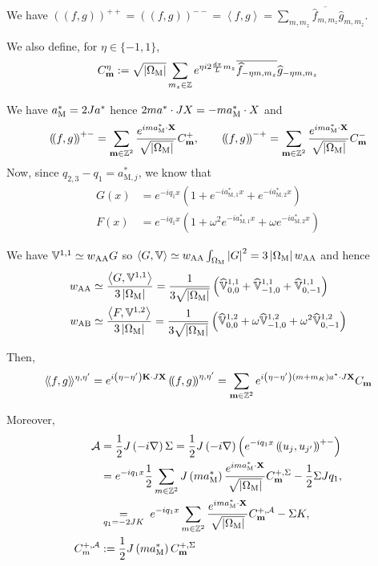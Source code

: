 \documentclass[11pt,a4paper,reqno,french,tikz]{amsart}
\newcommand\cA{\mathcal{A}}\newcommand\cB{\mathcal{B}}\newcommand\cC{\mathcal{C}}\newcommand\cD{\mathcal{D}}\newcommand\cE{\mathcal{E}}\newcommand\cF{\mathcal{F}}\newcommand\cG{\mathcal{G}}\newcommand\cH{\mathcal{H}}\newcommand\cI{\mathcal{I}}\newcommand\cJ{\mathcal{J}}\newcommand\cK{\mathcal{K}}\newcommand\cL{\mathcal{L}}\newcommand\cM{\mathcal{M}}\newcommand\cN{\mathcal{N}}\newcommand\cO{\mathcal{O}}\newcommand\cP{\mathcal{P}}\newcommand\cQ{\mathcal{Q}}\newcommand\cR{\mathcal{R}}\newcommand\cS{\mathcal{S}}\newcommand\cT{\mathcal{T}}\newcommand\cU{\mathcal{U}}\newcommand\cV{\mathcal{V}}\newcommand\cW{\mathcal{W}}\newcommand\cX{\mathcal{X}}\newcommand\cY{\mathcal{Y}}\newcommand\cZ{\mathcal{Z}}
\newcommand{\pa}[1]{\left( #1 \right)} %
\newcommand{\ab}[1]{\left|#1\right|} %
\newcommand{\ps}[1]{\left< #1 \right>} %
\newcommand{\na}{\nabla} %
\newcommand{\f}[2]{\frac{#1}{#2}} %
\newcommand{\ind}[1]{_{\textup{#1}}} %
\newcommand{\bbV}{\mathbb{V}}
\newcommand{\db}[1]{\left(\!\left( #1 \right)\!\right)}
\def\bX{{\mathbf X}}
\def\bmm{{\mathbf m}}
\def\bK{{\mathbf K}}
\def\bbV{{\mathbb V}}
\newcommand{\sqom}{\sqrt{\ab{\Omega\ind{M}}}}
\def\lAngle{\langle\!\langle}
\def\rAngle{\rangle\!\rangle}
\begin{document}
We have $\db{f,g}^{++} = \db{f,g}^{--} = \ps{f,g} = \sum_{m,m_z} \overline{\widehat{f}_{m,m_z}} \widehat{g}_{m,m_z}$.

 We also define, for $\eta \in \{-1,1\}$,
\begin{align*}
C^\eta_\bmm := \sqom\sum_{m_z \in \Z} e^{\eta i2 \f{d\pi}{L} m_z} \overline{\widehat{f}_{-\eta m,m_z}} \widehat{g}_{-\eta m,m_z}
\end{align*}


We have $a^*\ind{M} = 2 J a^*$ hence $2 ma^* \cdot JX = -m a\ind{M}^* \cdot X$ and
\begin{align*}
\db{f,g}^{+-} = \sum_{\bmm \in \Z^2} \f{e^{ima^*\ind{M} \cdot \bX}}{\sqom} C_{\bmm}^+, \qquad \db{f,g}^{-+} = \sum_{\bmm \in \Z^2} \f{e^{ima^*\ind{M} \cdot \bX}}{\sqom} C_{\bmm}^-
\end{align*}
Now, since $q_{2,3} - q_1 = a^*_{\text{M},j}$, we know that
\begin{align*}
G(x) &= e^{-iq_1 x} \pa{1 + e^{-i a_{\text{M} ,1}^* x} +e^{-i a_{\text{M},2}^* x}} \\
F(x) &= e^{-iq_1 x} \pa{1 + \omega^2 e^{-i a_{\text{M} ,1}^* x} + \omega e^{-i a_{\text{M},2}^* x}}
\end{align*}

We have $\bbV^{1,1} \simeq w\ind{AA} G$ so $\ps{G,\bbV} \simeq w\ind{AA} \int_{\Omega\ind{M}} \ab{G}^2 = 3 \ab{\Omega\ind{M}} w\ind{AA}$ and hence 
\begin{align*}
	w\ind{AA} &\simeq \f{\ps{G,\bbV^{1,1}}}{3 \ab{\Omega\ind{M}}} = \f{1}{3 \sqom}\pa{\widehat{\bbV}^{1,1}_{0,0} +\widehat{\bbV}^{1,1}_{-1,0} + \widehat{\bbV}^{1,1}_{0,-1}} \\
	w\ind{AB} &\simeq \f{\ps{F,\bbV^{1,2}}}{3 \ab{\Omega\ind{M}}} = \f{1}{3 \sqom}\pa{\widehat{\bbV}^{1,2}_{0,0} + \omega\widehat{\bbV}^{1,2}_{-1,0} + \omega^2 \widehat{\bbV}^{1,2}_{0,-1}}
\end{align*}

Then,
\begin{align*}
\lAngle f,g \rAngle ^{\eta,\eta'} = e^{i\pa{\eta-\eta'} \bK \cdot J \bX}\db{f,g}^{\eta,\eta'} =  \sum_{\bmm \in \Z^2} e^{i\pa{\eta-\eta'} \pa{m+m_K}a^* \cdot J \bX} C_\bmm
\end{align*}

Moreover, 
\begin{align*}
	\cA &= \f{1}{2} J \pa{-i\na} \Sigma= \f{1}{2} J \pa{-i\na} \pa{e^{-iq_1 x} \db{u_j,u_{j'}}^{+-}} \\
	    &= e^{-iq_1 x}\f 12 \sum_{m \in \Z^2} J \pa{ma_{\text{M}}^*} \f{e^{ima^*\ind{M} \cdot \bX}}{\sqom} C_{\bmm}^{+,\Sigma} - \f 12 \Sigma J q_1 ,\\
	    & \underset{\substack{q_1 = -2 JK}}{=} \; e^{-iq_1 x} \sum_{m \in \Z^2} \f{e^{ima^*\ind{M} \cdot \bX}}{\sqom} C_{\bmm}^{+,\cA} - \Sigma K,\\
C_{m}^{+,\cA} &:= \f 12 J \pa{ma_{\text{M}}^*}C_{\bmm}^{+,\Sigma}
\end{align*}
\end{document}
